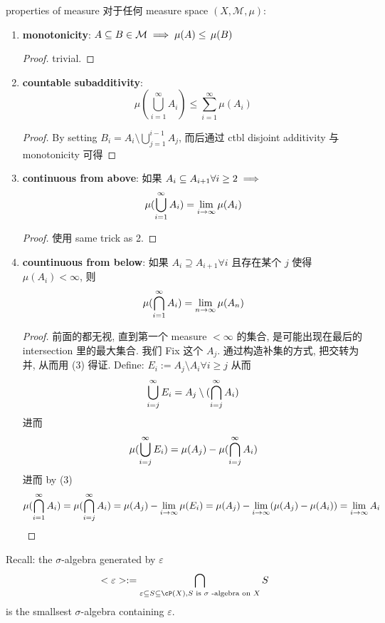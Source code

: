 \begin{theorem}{properties of measure}
    对于任何 measure space $(X,\mathcal{M}, \mu)$:
    \begin{enumerate}
        \item \textbf{monotonicity}: $A \subseteq B \in \mathcal{M} \implies \mu(A) \leq \,\mu(B)$
        \begin{proof}
            trivial.
        \end{proof}
        \item \textbf{countable subadditivity}: 
        $$
        \mu(\bigcup_{i=1}^\infty A_i) \leq \sum_{i=1}^\infty \mu(A_i)
        $$
        \begin{proof}
            By setting $B_i = A_i \setminus \bigcup_{j=1}^{i-1} A_j$, 而后通过 ctbl disjoint additivity 与 monotonicity 可得
        \end{proof}
        \item \textbf{continuous from above}: 
        如果 $A_i \subseteq A_{i+1} \forall i \geq 2\implies $
        $$
        \mu(\bigcup_{i=1}^{\infty}A_i   ) = \lim_{i \rightarrow \infty} \mu(A_i)
        $$
        \begin{proof}
            使用 same trick as 2.
        \end{proof}
        \item \textbf{countinuous from below}:
        如果 $A_i \supseteq A_{i+1} \forall i$ 且存在某个 $j$ 使得 $\mu(A_i) < \infty$, 则
        $$
        \mu(\bigcap_{i=1}^{\infty}A_i) = \lim_{n \rightarrow \infty} \mu(A_n)
        $$
        \begin{proof}
            前面的都无视, 直到第一个 measure $< \infty$ 的集合, 是可能出现在最后的 intersection 里的最大集合. 我们 Fix 这个 $A_j$. 通过构造补集的方式, 把交转为并, 从而用 (3) 得证.
            Define:
            $
            E_i := A_j \setminus A_i \forall i \geq j
            $
            从而
            $$
            \bigcup_{i=j}^\infty E_i = A_j \setminus (\bigcap_{i=j}^\infty A_i)
            $$进而 
            $$
            \mu( \bigcup_{i=j}^\infty E_i) = \mu(A_j) - \mu(\bigcap_{i=j}^\infty A_i)
            $$
            进而 by (3)
            $$
            \mu(\bigcap_{i=1}^\infty A_i) = \mu(\bigcap_{i=j}^\infty A_i) = \mu(A_j) - \lim_{i\rightarrow \infty}\mu(E_i)  = \mu(A_j) - \lim_{i\rightarrow \infty}(\mu(A_j) - \mu(A_i))
            = \lim_{i\rightarrow \infty} A_i
            $$
            
        \end{proof}
    \end{enumerate}
\end{theorem}
\noindent Recall: the $\sigma$-algebra generated by $\varepsilon$
    $$
    <\varepsilon> := \intsec_{\varepsilon  \sub S \sub \cP(X), \newline S \text{ is }\sigma \text{ -algebra on } X} S
    $$ is the smallsest $\sigma$-algebra containing $\varepsilon$.


